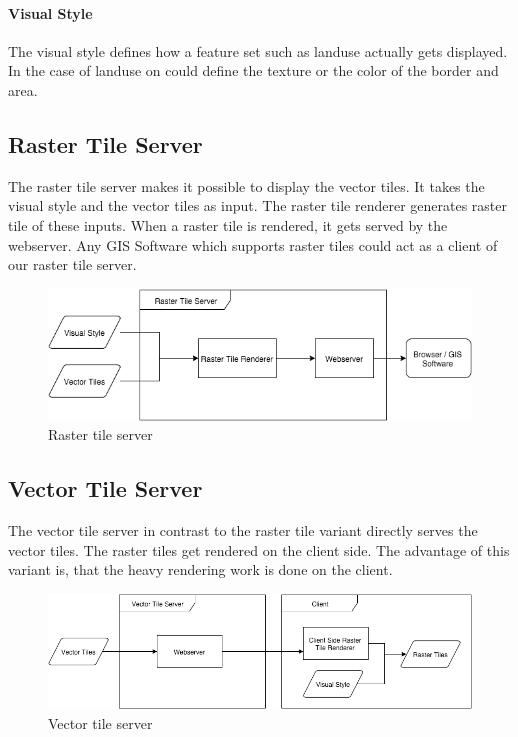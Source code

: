 \paragraph{Visual Style} The visual style defines how a feature set such as landuse actually gets displayed. In the case of landuse on could define the texture or the color of the border and area.

\subsection{Raster Tile Server}

The raster tile server makes it possible to display the vector tiles. It takes the visual style and the vector tiles as input. The raster tile renderer generates raster tile of these inputs. When a raster tile is rendered, it gets served by the webserver. Any GIS Software which supports raster tiles could act as a client of our raster tile server.

\begin{figure}[h]

  \centering
  \includegraphics[width=1\textwidth]{images/raster_tile_server.png}
  \caption{Raster tile server}
\end{figure}

\subsection{Vector Tile Server}

The vector tile server in contrast to the raster tile variant directly serves the vector tiles. The raster tiles get rendered on the client side. The advantage of this variant is, that the heavy rendering work is done on the client. 

\begin{figure}[h]

  \centering
  \includegraphics[width=1\textwidth]{images/vector_tile_server.png}
  \caption{Vector tile server}
\end{figure}

\newpage
